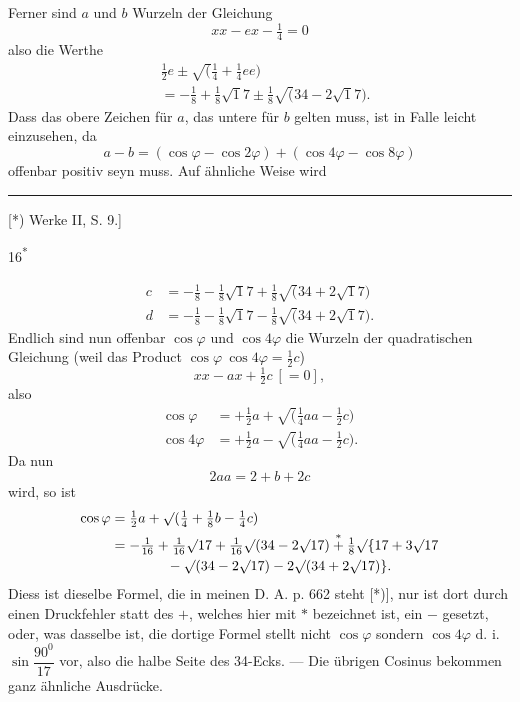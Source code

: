 Ferner sind $a$ und $b$ Wurzeln der Gleichung
\[xx-ex-\tfrac14=0\]
\noindent also die Werthe
\[\begin{aligned}
&\tfrac12e\pm\surd(\tfrac14+\tfrac14ee)\\
&=-\tfrac18+\tfrac18\surd17\pm\tfrac18\surd(34-2\surd17).
\end{aligned}\]
\noindent Dass das obere Zeichen für $a$, das untere für $b$ gelten muss, ist in
 Falle leicht einzusehen, da
\[a-b=(\cos\varphi-\cos2\varphi)+(\cos4\varphi-\cos8\varphi)\]
\noindent offenbar positiv seyn muss. Auf ähnliche Weise wird
\par\smallskip\noindent\rule{.25\linewidth}{.4pt}\par\smallskip
{\small\noindent\hspace*{\parindent}[*) Werke II, S. 9.]\par}
\par\vfill\noindent\hfill16\textsuperscript{*}\par
\clearpage
{}
\[\begin{aligned}
c&=-\tfrac18-\tfrac18\surd17+\tfrac18\surd(34+2\surd17)\\
d&=-\tfrac18-\tfrac18\surd17-\tfrac18\surd(34+2\surd17).
\end{aligned}\]
\noindent Endlich sind nun offenbar $\cos\varphi$ und $\cos4\varphi$ die Wurzeln der quadratischen
Gleichung (weil das Product $\cos\varphi\ \cos4\varphi=\tfrac12c$)
\[xx-ax+\tfrac12c\ [=0],\]
\noindent also
\[\begin{aligned}
\cos\varphi&=+\tfrac12a+\surd(\tfrac14aa-\tfrac12c)\\
\cos4\varphi&=+\tfrac12a-\surd(\tfrac14aa-\tfrac12c).
\end{aligned}\]
\noindent Da nun
\[2aa=2+b+2c\]
\noindent wird, so ist
\[\begin{aligned}
\cos\varphi&=\tfrac12a+\surd(\tfrac14+\tfrac18b-\tfrac14c)\\
&=-\tfrac1{16}+\tfrac1{16}\surd17+\tfrac1{16}\surd(34-2\surd17)
\overset{*}{+}\tfrac18\surd\{17+3\surd17\\
&\qquad\qquad{}-\surd(34-2\surd17)-2\surd(34+2\surd17)\}.
\end{aligned}\]
\noindent Diess ist dieselbe Formel, die in meinen D. A. p. 662 steht [*)], nur ist dort
durch einen Druckfehler statt des $+$, welches hier mit $*$ bezeichnet ist, ein $-$ gesetzt,
oder, was dasselbe ist, die dortige Formel stellt nicht $\cos\varphi$ sondern $\cos4\varphi$
d. i. $\sin\dfrac{90^0}{17}$ vor, also die halbe Seite des 34-Ecks. — Die übrigen Cosinus
bekommen ganz ähnliche Ausdrücke.

